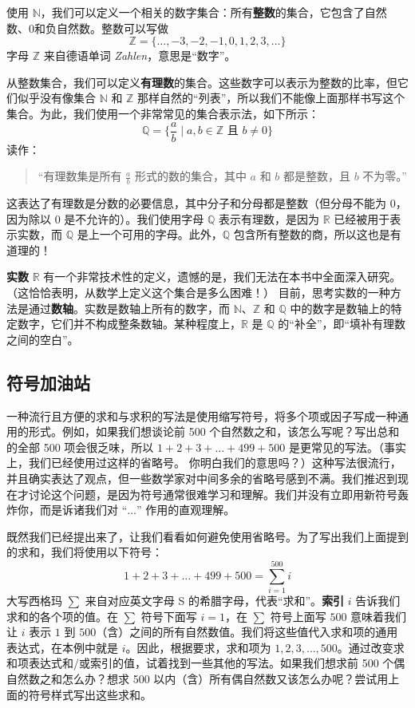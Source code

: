 使用 $\mathbb{N}$，我们可以定义一个相关的数字集合：所有\textbf{整数}的集合，它包含了自然数、0和负自然数。整数可以写做
\[\mathbb{Z} = \{\dots, -3, -2, -1, 0, 1, 2, 3, \dots\}\]
字母 $\mathbb{Z}$ 来自德语单词 \textit{Zahlen}，意思是“数字”。

从整数集合，我们可以定义\textbf{有理数}的集合。这些数字可以表示为整数的比率，但它们似乎没有像集合 $\mathbb{N}$ 和 $\mathbb{Z}$ 那样自然的“列表”，所以我们不能像上面那样书写这个集合。为此，我们使用一个非常常见的集合表示法，如下所示：
\[\mathbb{Q} = \Big\{\frac{a}{b} \mid a,b \in \mathbb{Z} \text{ 且 } b \ne 0\Big\}\]
读作：
\begin{quote}
    “有理数集是所有 $\frac{a}{b}$ 形式的数的集合，其中 $a$ 和 $b$ 都是整数，且 $b$ 不为零。”
\end{quote}
这表达了有理数是分数的必要信息，其中分子和分母都是整数（但分母不能为 $0$，因为除以 $0$ 是不允许的）。我们使用字母 $\mathbb{Q}$ 表示有理数，是因为 $\mathbb{R}$ 已经被用于表示实数，而 $\mathbb{Q}$ 是上一个可用的字母。此外，$\mathbb{Q}$ 包含所有整数的商，所以这也是有道理的！

\textbf{实数} $\mathbb{R}$ 有一个非常技术性的定义，遗憾的是，我们无法在本书中全面深入研究。（这恰恰表明，从数学上定义这个集合是多么困难！） 目前，思考实数的一种方法是通过\textbf{数轴}。实数是数轴上所有的数字，而 $\mathbb{N}$、$\mathbb{Z}$ 和 $\mathbb{Q}$ 中的数字是数轴上的特定数字，它们并不构成整条数轴。某种程度上，$\mathbb{R}$ 是 $\mathbb{Q}$ 的“补全”，即“填补有理数之间的空白”。

\subsection{符号加油站}

一种流行且方便的求和与求积的写法是使用缩写符号，将多个项或因子写成一种通用的形式。例如，如果我们想谈论前 500 个自然数之和，该怎么写呢？写出总和的全部 500 项会很乏味，所以 $1+2+3+\dots+499+500$ 是更常见的写法。（事实上，我们已经使用过这样的省略号。 你明白我们的意思吗？）这种写法很流行，并且确实表达了观点，但一些数学家对中间多余的省略号感到不满。我们推迟到现在才讨论这个问题，是因为符号通常很难学习和理解。我们并没有立即用新符号轰炸你，而是诉诸我们对 “$\dots$” 作用的直观理解。

既然我们已经提出来了，让我们看看如何避免使用省略号。为了写出我们上面提到的求和，我们将使用以下符号：
\[1+2+3+\dots+499+500 = \sum_{i=1}^{500}i\]
大写西格玛 $\sum$ 来自对应英文字母 S 的希腊字母，代表“求和”。\textbf{索引} $i$ 告诉我们求和的各个项的值。在 $\sum$ 符号下面写 $i = 1$，在 $\sum$ 符号上面写 $500$ 意味着我们让 $i$ 表示 $1$ 到 $500$（含）之间的所有自然数值。我们将这些值代入求和项的通用表达式，在本例中就是 $i$。因此，根据要求，求和项为 $1,2,3,\dots,500$。通过改变求和项表达式和/或索引的值，试着找到一些其他的写法。如果我们想求前 500 个偶自然数之和怎么办？想求 500 以内（含）所有偶自然数又该怎么办呢？尝试用上面的符号样式写出这些求和。

